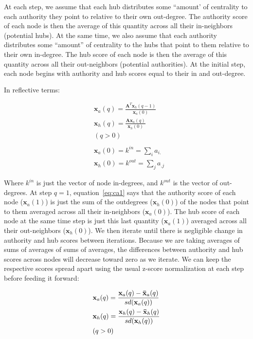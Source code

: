 \documentclass[a4paper,fleqn]{cas-sc}
\begin{document}
At each step, we assume that each hub distributes some ``amount' of centrality to each authority they point to relative to their own out-degree. The authority score of each node is then the average of this quantity across all their in-neighbors (potential hubs). At the same time, we also assume that each authority distributes some ``amount'' of centrality to the hubs that point to them relative to their own in-degree. The hub score of each node is then the average of this quantity across all their out-neighbors (potential authorities). At the initial step, each node begins with authority and hub scores equal to their in and out-degree.  

In reflective terms:

\begin{equation}
    \begin{split}
        &\mathbf{x}_a(q) = \frac{\mathbf{A}^T\mathbf{x}_h(q-1)}{\mathbf{x}_a(0)}  \\
        &\mathbf{x}_h(q) = \frac{\mathbf{A}\mathbf{x}_a(q)}{\mathbf{x}_h(0)}  \\ 
        & (q > 0) \\ \\
        &\mathbf{x}_a(0) = k^{in} = \sum_i a_{i.} \\
        &\mathbf{x}_h(0) = k^{out} = \sum_j a_{.j}     
    \end{split}
    \label{eq:ca1}
\end{equation}

Where $k^{in}$ is just the vector of node in-degrees, and $k^{out}$ is the vector of out-degrees. At step $q = 1$, equation~\ref{eq:ca1} says that the authority score of each node ($\mathbf{x}_a(1)$) is just the sum of the outdegrees ($\mathbf{x}_h(0)$) of the nodes that point to them averaged across all their in-neighbors ($\mathbf{x}_a(0)$). The hub score of each node at the same time step is just this last quantity ($\mathbf{x}_a(1)$) averaged across all their out-neighbors ($\mathbf{x}_h(0)$). We then iterate until there is negligible change in authority and hub scores between iterations. Because we are taking averages of sums of averages of sums of averages, the differences between authority and hub scores across nodes will decrease toward zero as we iterate. We can keep the respective scores spread apart using the usual z-score normalization at each step before feeding it forward:

\begin{equation}
    \begin{split}
        &\mathbf{x}_a(q) = \frac{\mathbf{x}_a(q) - \mathbf{\Bar{x}}_a(q)}{sd(\mathbf{x}_a(q))} \\
        &\mathbf{x}_h(q) = \frac{\mathbf{x}_h(q) - \mathbf{\Bar{x}}_h(q)}{sd(\mathbf{x}_h(q))} \\ 
        & (q > 0) 
    \end{split}
    \label{eq:ca-norm}
\end{equation}
\end{document}
